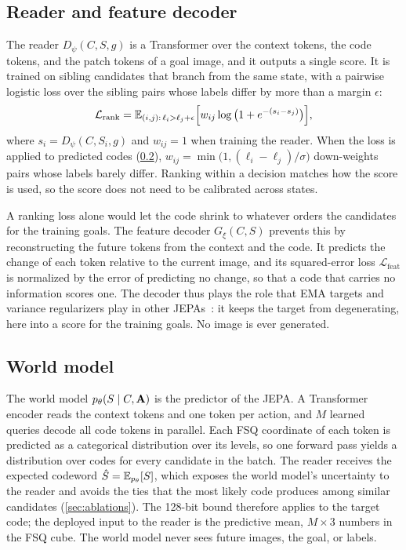 \subsection{Reader and feature decoder}
\label{sec:reader}
The reader $D_\psi(C,S,g)$ is a Transformer over the context tokens, the code tokens, and the patch tokens of a goal image, and it outputs a single score.
It is trained on sibling candidates that branch from the same state, with a pairwise logistic loss over the sibling pairs whose labels differ by more than a margin $\epsilon$:
\begin{equation}
  \mathcal{L}_{\mathrm{rank}}=\mathbb{E}_{(i,j):\,\ell_i>\ell_j+\epsilon}\Big[w_{ij}\log\big(1+e^{-(s_i-s_j)}\big)\Big],
\label{eq:rank}
\end{equation}
where $s_i=D_\psi(C,S_i,g)$ and $w_{ij}{=}1$ when training the reader.
When the loss is applied to predicted codes (\cref{sec:wm}), $w_{ij}=\min\big(1,(\ell_i-\ell_j)/\sigma\big)$ down-weights pairs whose labels barely differ.
Ranking within a decision matches how the score is used, so the score does not need to be calibrated across states.

A ranking loss alone would let the code shrink to whatever orders the candidates for the training goals.
The feature decoder $G_\xi(C,S)$ prevents this by reconstructing the future tokens from the context and the code.
It predicts the change of each token relative to the current image, and its squared-error loss $\mathcal{L}_{\mathrm{feat}}$ is normalized by the error of predicting no change, so that a code that carries no information scores one.
The decoder thus plays the role that EMA targets and variance regularizers play in other JEPAs~\cite{assran2023ijepa,lecun2022path}: it keeps the target from degenerating, here into a score for the training goals.
No image is ever generated.

\subsection{World model}
\label{sec:wm}
The world model $p_\theta(S\mid C,\mathbf{A})$ is the predictor of the JEPA.
A Transformer encoder reads the context tokens and one token per action, and $M$ learned queries decode all code tokens in parallel.
Each FSQ coordinate of each token is predicted as a categorical distribution over its levels, so one forward pass yields a distribution over codes for every candidate in the batch.
The reader receives the expected codeword $\hat S=\mathbb{E}_{p_\theta}[S]$, which exposes the world model's uncertainty to the reader and avoids the ties that the most likely code produces among similar candidates (\cref{sec:ablations}).
The 128-bit bound therefore applies to the target code; the deployed input to the reader is the predictive mean, $M{\times}3$ numbers in the FSQ cube.
The world model never sees future images, the goal, or labels.

